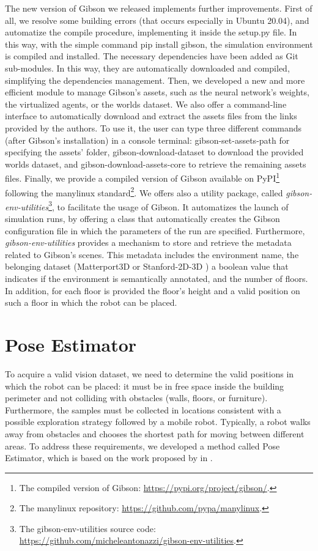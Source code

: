 The new version of Gibson we released implements further improvements. First of all, we resolve some building errors (that occurs especially in Ubuntu 20.04), and automatize the compile procedure, implementing it inside the \textsf{setup.py} file. In this way, with the simple command \textsf{pip install gibson}, the simulation environment is compiled and installed. The necessary dependencies have been added as Git sub-modules. In this way, they are automatically downloaded and compiled, simplifying the dependencies management. Then, we developed a new and more efficient module to manage Gibson's assets, such as the neural network's weights, the virtualized agents, or the worlds dataset. We also offer a command-line interface to automatically download and extract the assets files from the links provided by the authors. To use it, the user can type three different commands (after Gibson's installation) in a console terminal: \textsf{gibson-set-assets-path} for specifying the assets' folder, \textsf{gibson-download-dataset} to download the provided worlds dataset, and \textsf{gibson-download-assets-core} to retrieve the remaining assets files. Finally, we provide a compiled version of Gibson available on PyPI\footnote{The compiled version of Gibson: \url{https://pypi.org/project/gibson/}.} following the manylinux standard\footnote{The manylinux repository: \url{https://github.com/pypa/manylinux}.}. We offers also a utility package, called \textit{gibson-env-utilities}\footnote{The gibson-env-utilities source code: \url{https://github.com/micheleantonazzi/gibson-env-utilities}.}, to facilitate the usage of Gibson. It automatizes the launch of simulation runs, by offering a class that automatically creates the Gibson configuration file in which the parameters of the run are specified. Furthermore, \textit{gibson-env-utilities} provides a mechanism to store and retrieve the metadata related to Gibson's scenes. This metadata includes the environment name, the belonging dataset (Matterport3D \cite{matterport} or Stanford-2D-3D \cite{stanford2d3d}) a boolean value that indicates if the environment is semantically annotated, and the number of floors. In addition, for each floor is provided the floor's height and a valid position on such a floor in which the robot can be placed.


\section{Pose Estimator}
\label{sec:pose_estimator}
To acquire a valid vision dataset, we need to determine the valid positions in which the robot can be placed: it must be in free space inside the building perimeter and not colliding with obstacles (walls, floors, or furniture). Furthermore, the samples must be collected in locations consistent with a possible exploration strategy followed by a mobile robot. Typically, a robot walks away from obstacles and chooses the shortest path for moving between different areas. To address these requirements, we developed a method called Pose Estimator, which is based on the work proposed by \citeauthor{repeatabilityslamarxiv} in \cite{repeatabilityslamarxiv, repeatabilityslam}.

